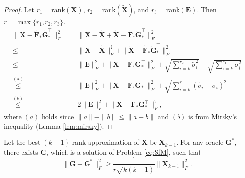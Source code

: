 \documentclass[journal]{IEEEtran}
\begin{document}
\begin{proof}
	Let $r_1 = $rank$(\textbf{X})$, $r_2 = $rank$(\widetilde{\textbf{X}})$, and $r_3 = $rank$(\textbf{E})$. Then $r = \max\{r_1, r_2, r_3\}.$
	\[
	\begin{aligned}
	\|\textbf{X} - \widetilde{\textbf{F}}_*\widetilde{\textbf{G}}_*^\top \|_F^2 =& \|\textbf{X} - \widetilde{\textbf{X}} + \widetilde{\textbf{X}} - \widetilde{\textbf{F}}_*\widetilde{\textbf{G}}_*^\top \|_F^2 \\
	\leq& \|\textbf{X} - \widetilde{\textbf{X}} \|_F^2 + \| \widetilde{\textbf{X}} - \widetilde{\textbf{F}}_*\widetilde{\textbf{G}}_*^\top \|_F^2 \\
	\leq& \|\textbf{E}\|_F^2 + \|\textbf{X} - \textbf{F}_*\textbf{G}_*^\top \|_F^2 + \sqrt{\sum_{i=k}^{r_2}\tilde{\sigma}_i^2} - \sqrt{\sum_{i=k}^{r_1}\sigma_i^2} \\
	\overset{(a)}{\leq} & \|\textbf{E}\|_F^2 + \|\textbf{X} - \textbf{F}_*\textbf{G}_*^\top \|_F^2 + \sqrt{\sum_{i=k}^{r}\left(\tilde{\sigma}_i - \sigma_i\right)^2 } \\
	\overset{(b)}{\leq}&   2\|\textbf{E}\|_F^2 + \|\textbf{X} - \textbf{F}_*\textbf{G}_*^\top \|_F^2,
	\end{aligned}
	\]
	where $(a)$ holds since $\|a\|-\|b\|\leq\|a-b\|$ and $(b)$ is from Mirsky's inequality (Lemma \ref{lem:mirsky}).
\end{proof}
\begin{thmm}
	Let the best $(k-1)$-rank approximation of $\mathbf{X}$ be $\mathbf{X}_{k-1}$.
	For any oracle $\mathbf{G}^*$, there exists $\mathbf{G}$, which is a solution of Problem \eqref{eq:SfM},  such that 
	\[
	\|\mathbf{G} - \mathbf{G}^*\|_F^2 \geq \frac{1}{r\sqrt{k(k-1)}} \| \mathbf{X}_{k-1}\|_F^2.
	\]
\end{thmm}
\end{document}
